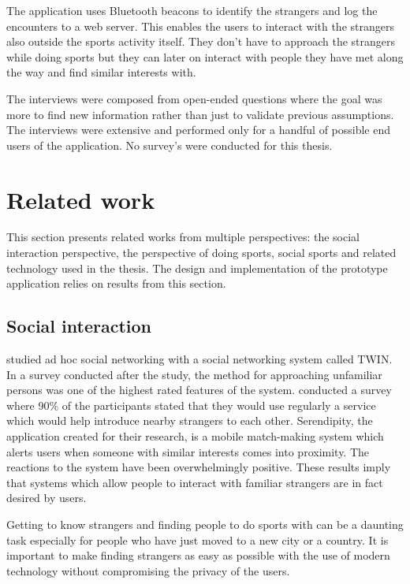 The application uses Bluetooth beacons to identify the strangers and log the encounters to a web server. This enables the users to interact with the strangers also outside the sports activity itself. They don't have to approach the strangers while doing sports but they can later on interact with people they have met along the way and find similar interests with. 

The interviews were composed from open-ended questions where the goal was more to find new information rather than just to validate previous assumptions. The interviews were extensive and performed only for a handful of possible end users of the application. No survey's were conducted for this thesis.

\section{Related work}

This section presents related works from multiple perspectives: the social interaction perspective, the perspective of doing sports, social sports and related technology used in the thesis. The design and implementation of the prototype application relies on results from this section.

\subsection{Social interaction}

\cite{socialAdHoc} studied ad hoc social networking with a social networking system called TWIN. In a survey conducted after the study, the method for approaching unfamiliar persons was one of the highest rated features of the system. \cite{mobileMatchmaking} conducted a survey where 90\% of the participants stated that they would use regularly a service which would help introduce nearby strangers to each other. Serendipity, the application created for their research, is a mobile match-making system which alerts users when someone with similar interests comes into proximity. The reactions to the system have been overwhelmingly positive. These results imply that systems which allow people to interact with familiar strangers are in fact desired by users.

Getting to know strangers and finding people to do sports with can be a daunting task especially for people who have just moved to a new city or a country. It is important to make finding strangers as easy as possible with the use of modern technology without compromising the privacy of the users.

